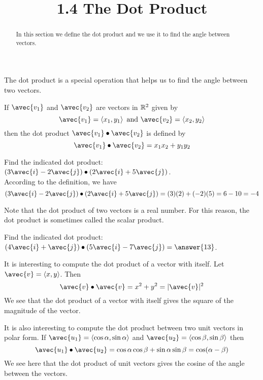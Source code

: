 \documentclass[handout]{ximera}
\title{1.4 The Dot Product}
\begin{document}
\begin{abstract}
In this section we define the dot product and we use it to find the angle between vectors.
\end{abstract}
 
\maketitle
The dot product is a special operation that helps us to find the angle between two vectors.
\begin{definition}
If $\avec{v_1}$ and $\avec{v_2}$ are vectors in $\mathbb R^2$ given by
\[
\avec{v_1} = \vector{x_1, y_1} \text{  and  } \avec{v_2} = \vector{x_2, y_2}
\]
then the dot product $\avec{v_1} \dotp \avec{v_2}$ is defined by
\[
\avec{v_1} \dotp \avec{v_2} = x_1x_2 + y_1y_2
\]
\end{definition}

\begin{example}
Find the indicated dot product: $\left(3\avec{i} -2\avec{j}\right) \dotp \left(2\avec{i} +5\avec{j}\right)$.\\
According to the definition, we have
\[
\left(3\avec{i} -2\avec{j}\right) \dotp \left(2\avec{i} +5\avec{j}\right) = (3)(2)+(-2)(5) = 6-10 = -4
\]
\end{example}

Note that the dot product of two vectors is a real number.  For this reason, the dot product is sometimes called the scalar product.

\begin{problem}
Find the indicated dot product: $\left(4\avec{i} + \avec{j}\right) \dotp \left(5\avec{i} -7\avec{j}\right) =\answer{13}$.\\
\end{problem}

It is interesting to compute the dot product of a vector with itself.  Let $\avec{v} = \vector{x, y}$. Then
\[
\avec{v} \dotp \avec{v} = x^2 + y^2 = |\avec{v}|^2
\]
We see that the dot product of a vector with itself gives the square of the magnitude of the vector.

It is also interesting to compute the dot product between two unit vectors in polar form.
If $\avec{u_1} = \vector{\cos \alpha, \sin \alpha}$ and $\avec{u_2} = \vector{\cos \beta, \sin \beta}$ then
\[
\avec{u_1} \dotp \avec{u_2} = \cos \alpha \cos \beta + \sin \alpha \sin \beta = \cos(\alpha - \beta)
\]
We see here that the dot product of unit vectors gives the cosine of the angle between the vectors.
\end{document}
